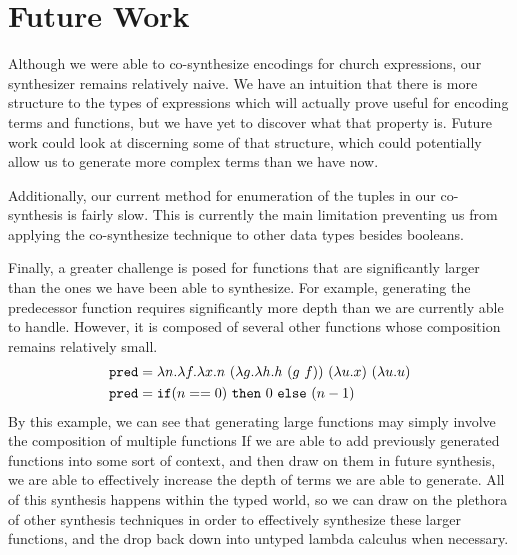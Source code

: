 \section{Future Work}
%
Although we were able to co-synthesize
encodings for church expressions, our synthesizer remains
relatively naive.
%
We have an intuition that there is more structure to the
types of expressions which will actually prove useful for
encoding terms and functions, but we have yet to discover
what that property is.
%
Future work could look at discerning some of that structure,
which could potentially allow us to generate more complex
terms than we have now.

Additionally, our current method for enumeration of the tuples in our
co-synthesis is fairly slow.
%
This is currently the main limitation preventing us from
applying the co-synthesize technique to other data types
besides booleans.

Finally, a greater challenge is posed for functions that are
significantly larger than the ones we have been able to
synthesize.
%
For example, generating the predecessor function requires
significantly more depth than we are currently able to
handle.
%
However, it is composed of several other functions whose composition remains
relatively small.
%
\begin{align*}
  \texttt{pred} &= \lambda n.\lambda f.\lambda x.n\
              (\lambda g.\lambda h.h\ (g\ f))\ (\lambda u.x)\ (\lambda u.u) \\
  \texttt{pred} &= \texttt{if} (n==0)\ \texttt{then}\ 0\ \texttt{else}\ (n-1)
\end{align*}
%
By this example, we can see that generating large functions
may simply involve the composition of multiple functions
%
If we are able to add previously generated functions into
some sort of context, and then draw on them in future
synthesis, we are able to effectively increase the depth of
terms we are able to generate.
%
All of this synthesis happens within the typed world, so we
can draw on the plethora of other synthesis techniques in
order to effectively synthesize these larger functions, and
the drop back down into untyped lambda calculus when
necessary.
